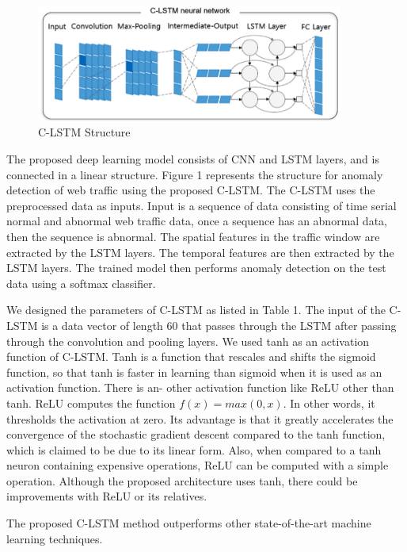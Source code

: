\documentclass{acmtog} %
\begin{document}
\begin{figure}
	\begin{center}
		\includegraphics[width=0.9\textwidth]{C-LSTM.png}
	\end{center}
	\caption{C-LSTM Structure}
	\label{RTL}
\end{figure}

The proposed deep learning model consists of CNN and LSTM layers, and is connected in a linear structure. Figure 1 represents the structure for anomaly detection of web traffic using the proposed C-LSTM. The C-LSTM uses the preprocessed data as inputs. Input is a sequence of data consisting of time serial normal and abnormal web traffic data, once a sequence has an abnormal data, then the sequence is abnormal. The spatial features in the traffic window are extracted by the LSTM layers. The temporal features are then extracted by the LSTM layers. The trained model then performs anomaly detection on the test data using a softmax classifier.

We designed the parameters of C-LSTM as listed in Table 1. The input of the C-LSTM is a data vector of length 60 that passes through the LSTM after passing through the convolution and pooling layers. We used tanh as an activation function of C-LSTM. Tanh is a function that rescales and shifts the sigmoid function, so that tanh is faster in learning than sigmoid when it is used as an activation function. There is an- other activation function like ReLU other than tanh. ReLU computes the function $f(x)=max⁡(0,x)$. In other words, it thresholds the activation at zero. Its advantage is that it greatly accelerates the convergence of the stochastic gradient descent compared to the tanh function, which is claimed to be due to its linear form. Also, when compared to a tanh neuron containing expensive operations, ReLU can be computed with a simple operation. Although the proposed architecture uses tanh, there could be improvements with ReLU or its relatives.

The proposed C-LSTM method outperforms other state-of-the-art machine learning techniques.
\end{document}
